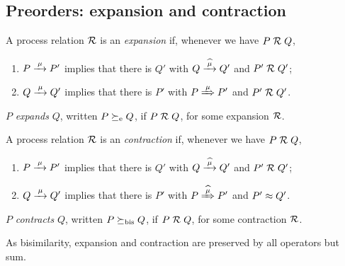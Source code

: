 \subsection{Preorders: expansion and contraction}

\begin{definition}[expansion]
\label{d:expa}
A process relation ${{\cal R}}$ 
 is an {\em  expansion} if, whenever
we have $P\mathrel{\cal R} Q$, %
\begin{enumerate}
\item   $P \arr\mu P'$ implies that there is $Q'$ with $Q \arcap \mu
  Q'$
 and $P' \mathrel{\cal R} Q'$;
\item 
    $Q \arr\mu Q'$   implies that there is $P'$ with $P \Arr \mu
 P'$ and $P' 
\mathrel{\cal R} Q'$.
\end{enumerate}
 $P$  {\em expands} $Q$, written
$P  \mathrel{\succeq_{\rm{e}}} Q$, 
if $P \mathrel{\cal R} Q$,  for some expansion ${\cal R}$. 
\end{definition}

\begin{definition}[contraction]
\label{d:expa}
A process relation ${{\cal R}}$ is an {\em contraction} if, whenever
we have $P\mathrel{\cal R} Q$, %
\begin{enumerate}
\item $P \arr\mu P'$ implies that there is $Q'$ with $Q \arcap \mu Q'$
 and $P' \mathrel{\cal R} Q'$;
\item $Q \arr\mu Q'$   implies that there is $P'$ with $P \Arcap \mu
 P'$ and $P' \approx Q'$.
\end{enumerate}
 $P$  {\em contracts} $Q$, written
$P  \mathrel{\succeq_{\rm{bis}}} Q$, 
if $P \mathrel{\cal R} Q$,  for some contraction ${\cal R}$. 
\end{definition}

As bisimilarity, expansion and contraction are preserved by all operators but sum.

